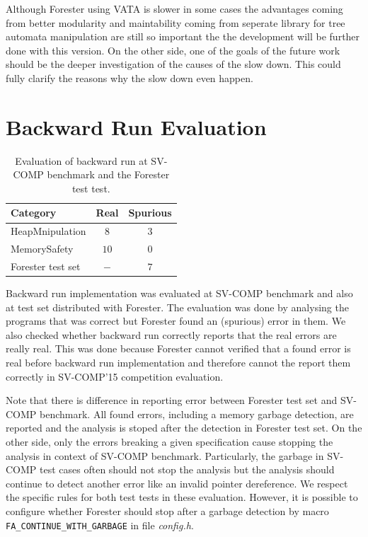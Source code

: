 Although Forester using VATA is slower in some cases
the advantages coming from better
modularity and maintability coming from seperate library
for tree automata manipulation are still so important
the the development will be further done with this version.
On the other side, one of the goals of the future work should be
the deeper investigation of the causes of the slow down.
This could fully clarify the reasons why the slow down even happen.


\section{Backward Run Evaluation}
\label{sec:bweval}

\begin{table}[buh!]
	\vskip6pt
	\caption{Evaluation of backward run at SV-COMP benchmark
		and the Forester test test.
	}
	\centering
	\begin{tabular}{lcc}
		\toprule
		Category & Real & Spurious \\
		\midrule
		HeapMnipulation & $8$ & $3$ \\
		MemorySafety & $10$ & $0$ \\
		Forester test set & $-$ & $7$ \\
		\bottomrule
	\end{tabular}
	\label{tab:bwres}
\end{table}

Backward run implementation was evaluated at SV-COMP benchmark
and also at test set distributed with Forester.
The evaluation was done by analysing the programs that was correct
but Forester found an (spurious) error in them.
We also checked whether backward run correctly
reports that the real errors are really real.
This was done because Forester cannot verified
that a found error is real before backward run implementation
and therefore cannot the report them correctly in SV-COMP'15 competition
evaluation.

Note that there is difference in reporting error between
Forester test set and SV-COMP benchmark.
All found errors, including a memory garbage detection, are reported
and the analysis is stoped after the detection in Forester test set.
On the other side, only the errors breaking a given specification
cause stopping the analysis in context of SV-COMP benchmark.
Particularly, the garbage in SV-COMP test cases often should not
stop the analysis but the analysis should continue to
detect another error like an invalid pointer dereference.
We respect the specific rules for both test tests in these evaluation.
However, it is possible to configure whether
Forester should stop after a garbage detection by
macro {\tt FA\_CONTINUE\_WITH\_GARBAGE} in file \emph{config.h}.

